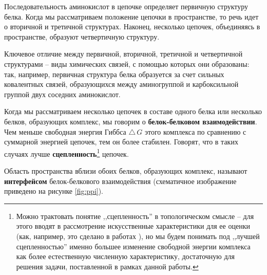 Последовательность аминокислот в цепочке определяет первичную структуру белка. Когда мы рассматриваем положение цепочки в пространстве, то речь идет о вторичной и третичной структурах. Наконец, несколько цепочек, объединяясь в пространстве, образуют четвертичную структуру.

Ключевое отличие между первичной, вторичной, третичной и четвертичной структурами -- виды химических связей, с помощью которых они образованы: так, например, первичная структура белка образуется за  счет сильных ковалентных связей, образующихся между аминогруппой и карбоксильной группой двух соседних аминокислот.

Когда мы рассматриваем несколько цепочек в составе одного белка или несколько белков, образующих комплекс, мы говорим о \textbf{белок-белковом взаимодействии}.
Чем меньше свободная энергия Гиббса $\triangle\,G$ этого комплекса по сравнению с суммарной энергией цепочек, тем он более стабилен. Говорят, что в таких случаях лучше \textbf{сцепленность}\footnote{Можно трактовать понятие ,,сцепленность'' в топологическом смысле -- для этого вводят в рассмотрение искусственные характеристики для ее оценки (как, например, это сделано в работах \cite{ialign, pcalign}), но мы будем понимать под ,,лучшей сцепленностью'' именно большее изменение  свободной энергии комплекса как более естественную численную характеристику, достаточную для решения задачи, поставленной в рамках данной работы. } цепочек. 





Область пространства вблизи обоих белков, образующих комплекс, называют \textbf{интерфейсом} белок-белкового взаимодействия (схематичное изображение приведено на рисунке \ref{fig:ppi}). 



